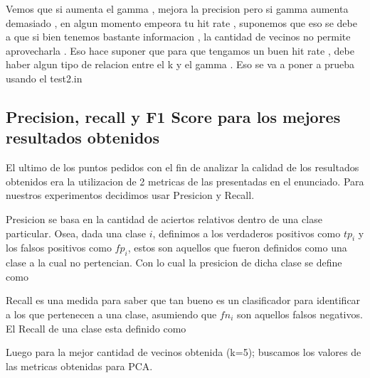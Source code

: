 Vemos que si aumenta el gamma , mejora la precision pero si gamma aumenta demasiado , en algun momento empeora tu hit rate , suponemos que eso se debe a que si bien tenemos bastante informacion , la cantidad de vecinos no permite aprovecharla . Eso hace suponer que para que tengamos un buen hit rate , debe haber algun tipo de relacion entre el k y el gamma . Eso se va a poner a prueba usando el test2.in

\subsection {Precision, recall y F1 Score para los mejores resultados obtenidos}

El ultimo de los puntos pedidos con el fin de analizar la calidad de los resultados obtenidos era la utilizacion de 2 metricas de las presentadas en el enunciado. Para nuestros experimentos decidimos usar Presicion y Recall.

Presicion se basa en la cantidad de aciertos relativos dentro de una clase particular. Osea, dada una clase $i$, definimos a los verdaderos positivos como $tp_i$ y los falsos positivos como $fp_i$, estos son aquellos que fueron definidos como una clase a la cual no pertencian.
Con lo cual la presicion de dicha clase se define como \\

Recall es una medida para saber que tan bueno es un clasificador para identificar a los que pertenecen a una clase, asumiendo que $fn_i$ son aquellos falsos negativos.
El Recall de una clase esta definido como \\

Luego para la mejor cantidad de vecinos obtenida (k=5); buscamos los valores de las metricas obtenidas para PCA.

